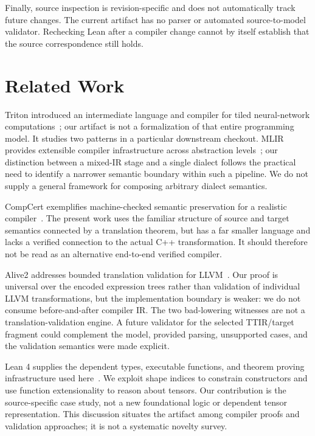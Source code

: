 \documentclass[a4paper,USenglish,anonymous]{lipics-v2021}
\begin{document}
Finally, source inspection is revision-specific and does not automatically
track future changes. The current artifact has no parser or automated
source-to-model validator. Rechecking Lean after a compiler change cannot
by itself establish that the source correspondence still holds.

\section{Related Work}
Triton introduced an intermediate language and compiler for tiled
neural-network computations~\cite{triton}; our artifact is not a
formalization of that entire programming model. It studies two patterns
in a particular downstream checkout. MLIR provides extensible compiler
infrastructure across abstraction levels~\cite{mlir}; our distinction
between a mixed-IR stage and a single dialect follows the practical need
to identify a narrower semantic boundary within such a pipeline. We do
not supply a general framework for composing arbitrary dialect semantics.

CompCert exemplifies machine-checked semantic preservation for a realistic
compiler~\cite{compcert}. The present work uses the familiar structure
of source and target semantics connected by a translation theorem, but
has a far smaller language and lacks a verified connection to the actual
C++ transformation. It should therefore not be read as an alternative
end-to-end verified compiler.

Alive2 addresses bounded translation validation for LLVM~\cite{alive2}.
Our proof is universal over the encoded expression trees rather than
validation of individual LLVM transformations, but the implementation
boundary is weaker: we do not consume before-and-after compiler IR. The
two bad-lowering witnesses are not a translation-validation engine. A
future validator for the selected TTIR/target fragment could complement
the model, provided parsing, unsupported cases, and the validation
semantics were made explicit.

Lean 4 supplies the dependent types, executable functions, and theorem
proving infrastructure used here~\cite{lean4}. We exploit shape indices
to constrain constructors and use function extensionality to reason
about tensors. Our contribution is the source-specific case study,
not a new foundational logic or dependent tensor representation. This
discussion situates the artifact among compiler proofs and validation
approaches; it is not a systematic novelty survey.
\end{document}
